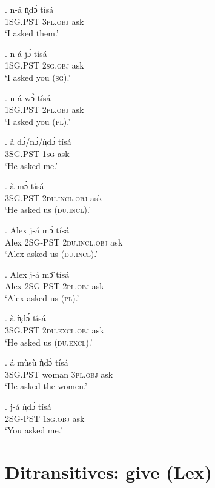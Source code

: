 \documentclass{assets/fieldnotes}
\begin{document}
\exg. n-á ǹ̩dɔ̀ tísá\\
\textsc{1SG.PST} \textsc{3pl.obj} ask\\
`I asked them.’

\exg. n-á jɔ́ tísá\\
\textsc{1SG.PST} \textsc{2sg.obj} ask\\
`I asked you (\textsc{sg}).’

\exg. n-á wɔ̀ tísá\\
\textsc{1SG.PST} \textsc{2pl.obj} ask\\
`I asked you (\textsc{pl}).’

\exg. ǎ dɔ́/nɔ́/ń̩dɔ́ tísá\\
\textsc{3SG.PST} \textsc{1sg} ask\\
`He asked me.’\\

\exg. ǎ mɔ̀ tísá\\
\textsc{3SG.PST} \textsc{2du.incl.obj} ask\\
`He asked us (\textsc{du.incl}).’


\exg. Alex j-á mɔ̀ tísá\\
Alex 2SG-PST \textsc{2du.incl.obj} ask\\
`Alex asked us (\textsc{du.incl}).’

\exg. Alex j-á mɔ̂ tísá\\
Alex 2SG-PST \textsc{2pl.obj} ask\\
`Alex asked us (\textsc{pl}).’

\exg. à ǹ̩dɔ́ tísá\\
3SG.PST \textsc{2du.excl.obj} ask\\
`He asked us (\textsc{du.excl}).'

\exg. á mùsù ǹ̩dɔ́ tísá\\
\textsc{3SG.PST} woman \textsc{3pl.obj} ask\\
`He asked the women.’

\exg. j-á ń̩dɔ́ tísá\\
\textsc{2SG-PST} \textsc{1sg.obj} ask\\
`You asked me.’



\section{Ditransitives: give (Lex)}
\end{document}
